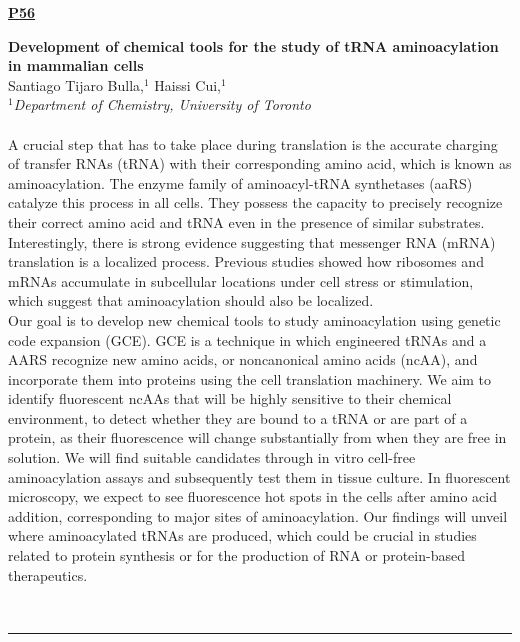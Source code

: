 \documentclass[titlepage,oneside,openany,10pt]{book}
\newenvironment{posterabs}[4] %
        {
	\begin{flushright}
                \underline{\textbf{#4}}
        \end{flushright}
        \textbf{#1}\\%
        #2\\%
        \textit{#3}\\\\%
        }
        {
        \\
        \noindent\rule{15cm}{0.5pt}%
        }
\begin{document}
\vspace{1cm}

\begin{posterabs}
    {Development of chemical tools for the study of tRNA aminoacylation in mammalian cells}
    {Santiago Tijaro Bulla,$^{1}$ Haissi Cui,$^{1}$}
    {
    $^1$Department of Chemistry, University of Toronto
    }
    {P56}
    A crucial step that has to take place during translation is the accurate charging of transfer RNAs (tRNA) with their corresponding amino acid, which is known as aminoacylation. The enzyme family of aminoacyl-tRNA synthetases (aaRS) catalyze this process in all cells. They possess the capacity to precisely recognize their correct amino acid and tRNA even in the presence of similar substrates. Interestingly, there is strong evidence suggesting that messenger RNA (mRNA) translation is a localized process. Previous studies showed how ribosomes and mRNAs accumulate in subcellular locations under cell stress or stimulation, which suggest that aminoacylation should also be localized.\\Our goal is to develop new chemical tools to study aminoacylation using genetic code expansion (GCE). GCE is a technique in which engineered tRNAs and a AARS recognize new amino acids, or noncanonical amino acids (ncAA), and incorporate them into proteins using the cell translation machinery. We aim to identify fluorescent ncAAs that will be highly sensitive to their chemical environment, to detect whether they are bound to a tRNA or are part of a protein, as their fluorescence will change substantially from when they are free in solution. We will find suitable candidates through in vitro cell-free aminoacylation assays and subsequently test them in tissue culture. In fluorescent microscopy, we expect to see fluorescence hot spots in the cells after amino acid addition, corresponding to major sites of aminoacylation. Our findings will unveil where aminoacylated tRNAs are produced, which could be crucial in studies related to protein synthesis or for the production of RNA or protein-based therapeutics.
    \label{Tijaro bullaS}
\end{posterabs}

\newpage
\end{document}

